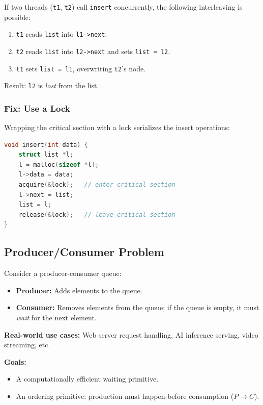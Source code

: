 \documentclass[11pt]{article}
\begin{document}
If two threads (\texttt{t1}, \texttt{t2}) call \texttt{insert} concurrently, the following interleaving is possible:
\begin{enumerate}
    \item \texttt{t1} reads \texttt{list} into \texttt{l1->next}.
    \item \texttt{t2} reads \texttt{list} into \texttt{l2->next} and sets \texttt{list = l2}.
    \item \texttt{t1} sets \texttt{list = l1}, overwriting \texttt{t2}'s node.
\end{enumerate}
Result: \texttt{l2} is \emph{lost} from the list.

\subsubsection*{Fix: Use a Lock}

Wrapping the critical section with a lock serializes the insert operations:

\begin{lstlisting}[language=C, caption={Concurrent list insert (with lock)}]
void insert(int data) {
    struct list *l;
    l = malloc(sizeof *l);
    l->data = data;
    acquire(&lock);   // enter critical section
    l->next = list;
    list = l;
    release(&lock);   // leave critical section
}
\end{lstlisting}

\subsection{Producer/Consumer Problem}

Consider a producer-consumer queue:

\begin{itemize}
    \item \textbf{Producer:} Adds elements to the queue.
    \item \textbf{Consumer:} Removes elements from the queue; if the queue is empty, it must \emph{wait} for the next element.
\end{itemize}

\textbf{Real-world use cases:} Web server request handling, AI inference serving, video streaming, etc.

\textbf{Goals:}
\begin{itemize}
    \item A computationally efficient waiting primitive.
    \item An ordering primitive: production must happen-before consumption ($P \to C$).
\end{itemize}
\end{document}
